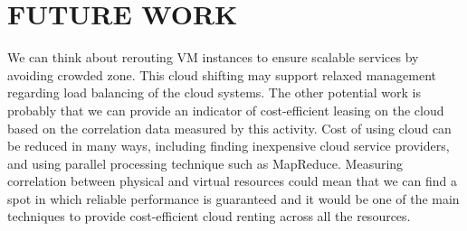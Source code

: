 \documentclass{sig-alternate-05-2015}
\begin{document}
\section{FUTURE WORK}

We can think about rerouting VM instances to ensure scalable services by avoiding crowded zone. This cloud shifting may support relaxed management regarding load balancing of the cloud systems. The other potential work is probably that we can provide an indicator of cost-efficient leasing on the cloud based on the correlation data measured by this activity. Cost of using cloud can be reduced in many ways, including finding inexpensive cloud service providers, and using parallel processing technique such as MapReduce. Measuring correlation between physical and virtual resources could mean that we can find a spot in which reliable performance is guaranteed and it would be one of the main techniques to provide cost-efficient cloud renting across all the resources.


\end{document}
